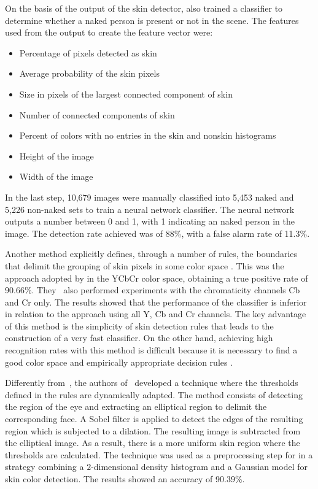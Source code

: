 On the basis of the output of the skin detector, \citet{jones:02} also trained a classifier to determine whether a naked person is present or not in the scene. The features used from the output to create the feature vector were:
\begin{itemize}
    \item Percentage of pixels detected as skin
    \item Average probability of the skin pixels
    \item Size in pixels of the largest connected component of skin
    \item Number of connected components of skin
    \item Percent of colors with no entries in the skin and nonskin histograms
    \item Height of the image
    \item Width of the image
\end{itemize}

In the last step, 10,679 images were manually classified into 5,453 naked and 5,226 non-naked sets to train a neural network classifier. The neural network outputs a number between 0 and 1, with 1 indicating an naked person in the image. The detection rate achieved was of 88\%, with a false alarm rate of 11.3\%.

Another method explicitly defines, through a number of rules, the boundaries that delimit the grouping of skin pixels in some color space \citep{vezhnevets:03}. This was the approach adopted by \citet{kovac:03} in the YCbCr color space, obtaining a true positive rate of 90.66\%. They~\citep{kovac:03} also performed experiments with the chromaticity channels Cb and Cr only. The results showed that the performance of the classifier is inferior in relation to the approach using all Y, Cb and Cr channels. The key advantage of this method is the simplicity of skin detection rules that leads to the construction of a very fast classifier. On the other hand, achieving high recognition rates with this method is difficult because it is necessary to find a good color space and empirically appropriate decision rules \citep{vezhnevets:03}.

Differently from~\citet{kovac:03}, the authors of~\citet{yogarajah:11} developed a technique where the thresholds defined in the rules are dynamically adapted. The method consists of detecting the region of the eye and extracting an elliptical region to delimit the corresponding face. A Sobel filter is applied to detect the edges of the resulting region which is subjected to a dilation. The resulting image is subtracted from the elliptical image. As a result, there is a more uniform skin region where the thresholds are calculated. The technique was used as a preprocessing step for \citet{tan:12} in a strategy combining a $2$-dimensional density histogram and a Gaussian model for skin color detection. The results showed an accuracy of 90.39\%.

